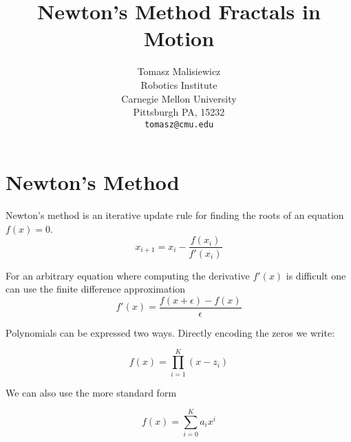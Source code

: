 \documentclass[12pt,letterpaper]{article}
\begin{document}
\title{Newton's Method Fractals in Motion}

\author{Tomasz Malisiewicz\\
Robotics Institute \\
Carnegie Mellon University\\
Pittsburgh PA, 15232\\
{\tt\small tomasz@cmu.edu}
}

\maketitle
{}

\section{Newton's Method}
Newton's method is an iterative update rule for finding the roots of
an equation $f(x)=0$.
\begin{equation}
x_{i+1} = x_{i} - \frac{f(x_i)}{f'(x_i)}
\end{equation}

For an arbitrary equation where computing the derivative $f'(x)$ is
difficult one can use the finite difference approximation
\begin{equation}
f'(x) = \frac{f(x+\epsilon)-f(x)}{\epsilon}
\end{equation}

Polynomials can be expressed two ways.  Directly encoding the zeros we
write:

\begin{equation}
f(x) = \prod_{i=1}^K(x-z_i)
\end{equation}

We can also use the more standard form

\begin{equation}
f(x) = \sum_{i=0}^K a_i x^i
\end{equation}
\end{document}
